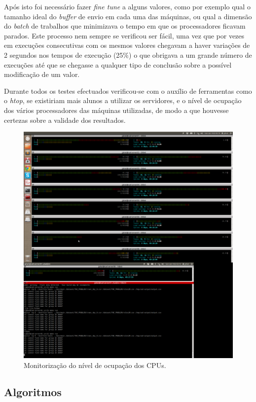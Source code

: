 \documentclass[a4paper]{article}
\begin{document}
Após isto foi necessário fazer \textit{fine tune} a alguns valores, como por exemplo qual o tamanho ideal do \textit{buffer} de envio em cada uma das máquinas, ou qual a dimensão do \textit{batch} de trabalhos que minimizava o tempo em que os processadores ficavam parados. Este processo nem sempre se verificou ser fácil, uma vez que por vezes em execuções consecutivas com os mesmos valores chegavam a haver variações de 2 segundos nos tempos de execução (25\%) o que obrigava a um grande número de execuções até que se chegasse a qualquer tipo de conclusão sobre a possível modificação de um valor.

Durante todos os testes efectuados verificou-se com o auxílio de ferramentas como o \textit{htop}, se existiriam mais alunos a utilizar os servidores, e o nível de ocupação dos vários processadores das máquinas utilizadas, de modo a que houvesse certezas sobre a validade dos resultados.
\begin{figure}[h]
	\includegraphics[keepaspectratio=true, width=0.4\textheight]{imgs/ocupacao.png}
	\caption{Monitorização do nível de ocupação dos CPUs.}
\end{figure}

\subsection{Algoritmos}
\end{document}
